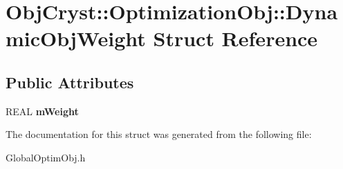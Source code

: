 \hypertarget{struct_obj_cryst_1_1_optimization_obj_1_1_dynamic_obj_weight}{}\section{Obj\+Cryst\+::Optimization\+Obj\+::Dynamic\+Obj\+Weight Struct Reference}
\label{struct_obj_cryst_1_1_optimization_obj_1_1_dynamic_obj_weight}
\subsection*{Public Attributes}
\begin{DoxyCompactItemize}
\item 
\mbox{\label{struct_obj_cryst_1_1_optimization_obj_1_1_dynamic_obj_weight_ab2eb23e9d26b743e5cd38d1040ee802f}} 
R\+E\+AL {\bfseries m\+Weight}
\end{DoxyCompactItemize}


The documentation for this struct was generated from the following file\+:\begin{DoxyCompactItemize}
\item 
Global\+Optim\+Obj.\+h\end{DoxyCompactItemize}
